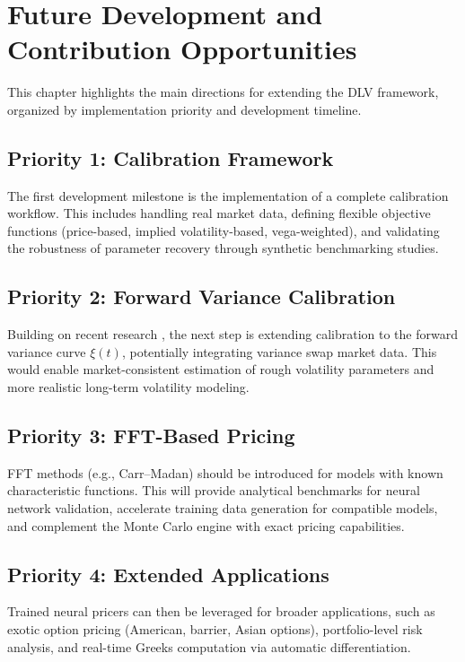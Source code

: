 	\chapter{Future Development and Contribution Opportunities}
	\label{ch:future-development}
	
	This chapter highlights the main directions for extending the DLV framework, organized by implementation priority and development timeline.
	
	\section{Priority 1: Calibration Framework}
	
	The first development milestone is the implementation of a complete calibration workflow.
	This includes handling real market data, defining flexible objective functions (price-based, implied volatility-based, vega-weighted), and validating the robustness of parameter recovery through synthetic benchmarking studies.
	
	\section{Priority 2: Forward Variance Calibration}
	
	Building on recent research \citep{Baschetti2024DeepCalibrationRandomGrids}, the next step is extending calibration to the forward variance curve $\xi(t)$, potentially integrating variance swap market data. This would enable market-consistent estimation of rough volatility parameters and more realistic long-term volatility modeling.
	
	\section{Priority 3: FFT-Based Pricing}
	
	FFT methods (e.g., Carr–Madan) should be introduced for models with known characteristic functions. This will provide analytical benchmarks for neural network validation, accelerate training data generation for compatible models, and complement the Monte Carlo engine with exact pricing capabilities.
	
	\section{Priority 4: Extended Applications}
	
	Trained neural pricers can then be leveraged for broader applications, such as exotic option pricing (American, barrier, Asian options), portfolio-level risk analysis, and real-time Greeks computation via automatic differentiation.
	
